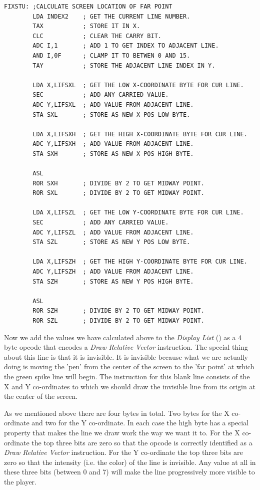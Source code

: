 \begin{lstlisting}
FIXSTU: ;CALCULATE SCREEN LOCATION OF FAR POINT
        LDA INDEX2    ; GET THE CURRENT LINE NUMBER.
        TAX           ; STORE IT IN X.
        CLC           ; CLEAR THE CARRY BIT.
        ADC I,1       ; ADD 1 TO GET INDEX TO ADJACENT LINE.
        AND I,0F      ; CLAMP IT TO BETWEN 0 AND 15.
        TAY           ; STORE THE ADJACENT LINE INDEX IN Y.

        LDA X,LIFSXL  ; GET THE LOW X-COORDINATE BYTE FOR CUR LINE.
        SEC           ; ADD ANY CARRIED VALUE.
        ADC Y,LIFSXL  ; ADD VALUE FROM ADJACENT LINE.
        STA SXL       ; STORE AS NEW X POS LOW BYTE.

        LDA X,LIFSXH  ; GET THE HIGH X-COORDINATE BYTE FOR CUR LINE.
        ADC Y,LIFSXH  ; ADD VALUE FROM ADJACENT LINE.
        STA SXH       ; STORE AS NEW X POS HIGH BYTE.

        ASL
        ROR SXH       ; DIVIDE BY 2 TO GET MIDWAY POINT.
        ROR SXL       ; DIVIDE BY 2 TO GET MIDWAY POINT.

        LDA X,LIFSZL  ; GET THE LOW Y-COORDINATE BYTE FOR CUR LINE.
        SEC           ; ADD ANY CARRIED VALUE.
        ADC Y,LIFSZL  ; ADD VALUE FROM ADJACENT LINE.
        STA SZL       ; STORE AS NEW Y POS LOW BYTE.

        LDA X,LIFSZH  ; GET THE HIGH Y-COORDINATE BYTE FOR CUR LINE.
        ADC Y,LIFSZH  ; ADD VALUE FROM ADJACENT LINE.
        STA SZH       ; STORE AS NEW Y POS HIGH BYTE.

        ASL
        ROR SZH       ; DIVIDE BY 2 TO GET MIDWAY POINT.
        ROR SZL       ; DIVIDE BY 2 TO GET MIDWAY POINT.
\end{lstlisting}

Now we add the values we have calculated above to the \textit{Display List} () as a 4 byte opcode that encodes
a \textit{Draw Relative Vector} instruction. The special thing about this line is that it is invisible. It is invisible
because what we are actually doing is moving the 'pen' from the center of the screen to the 'far point' at which the green
spike line will begin. The instruction for this blank line consists of the X and Y co-ordinates
to which we should draw the invisible line from its origin at the center of the screen.

As we mentioned above there are four bytes in total. Two bytes
for the X co-ordinate and two for the Y co-ordinate. In each case the high byte has a special property that makes the line
we draw work the way we want it to. For the X co-ordinate the top three bits are zero so that the opcode is correctly identified
as a \textit{Draw Relative Vector} instruction. For the Y co-ordinate the top three bits are zero so that the intensity (i.e. the color)
of the line is invisible. Any value at all in these three bits (between 0 and 7) will make the line progressively more visible to the
player.

